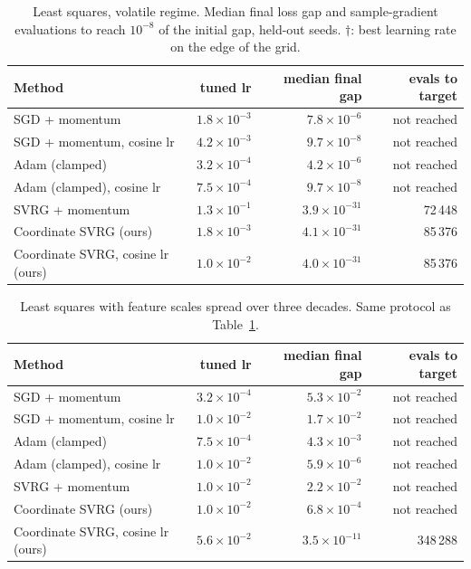 \begin{table}[h]
\centering
\small
\begin{tabular}{@{}lrrr@{}}
\toprule
Method & tuned lr & median final gap & evals to target \\
\midrule
SGD + momentum & $1.8\times 10^{-3}$ & $7.8\times 10^{-6}$ & not reached \\
SGD + momentum, cosine lr & $4.2\times 10^{-3}$ & $9.7\times 10^{-8}$ & not reached \\
Adam (clamped) & $3.2\times 10^{-4}$ & $4.2\times 10^{-6}$ & not reached \\
Adam (clamped), cosine lr & $7.5\times 10^{-4}$ & $9.7\times 10^{-8}$ & not reached \\
SVRG + momentum & $1.3\times 10^{-1}$ & $3.9\times 10^{-31}$ & 72\,448 \\
Coordinate SVRG (ours) & $1.8\times 10^{-3}$ & $4.1\times 10^{-31}$ & 85\,376 \\
Coordinate SVRG, cosine lr (ours) & $1.0\times 10^{-2}$ & $4.0\times 10^{-31}$ & 85\,376 \\
\bottomrule
\end{tabular}
\caption{Least squares, volatile regime. Median final loss gap and sample-gradient evaluations to reach $10^{-8}$ of the initial gap, held-out seeds. $\dagger$: best learning rate on the edge of the grid.}
\label{tab:ls}
\end{table}

\begin{table}[h]
\centering
\small
\begin{tabular}{@{}lrrr@{}}
\toprule
Method & tuned lr & median final gap & evals to target \\
\midrule
SGD + momentum & $3.2\times 10^{-4}$ & $5.3\times 10^{-2}$ & not reached \\
SGD + momentum, cosine lr & $1.0\times 10^{-2}$ & $1.7\times 10^{-2}$ & not reached \\
Adam (clamped) & $7.5\times 10^{-4}$ & $4.3\times 10^{-3}$ & not reached \\
Adam (clamped), cosine lr & $1.0\times 10^{-2}$ & $5.9\times 10^{-6}$ & not reached \\
SVRG + momentum & $1.0\times 10^{-2}$ & $2.2\times 10^{-2}$ & not reached \\
Coordinate SVRG (ours) & $1.0\times 10^{-2}$ & $6.8\times 10^{-4}$ & not reached \\
Coordinate SVRG, cosine lr (ours) & $5.6\times 10^{-2}$ & $3.5\times 10^{-11}$ & 348\,288 \\
\bottomrule
\end{tabular}
\caption{Least squares with feature scales spread over three decades. Same protocol as Table~\ref{tab:ls}.}
\label{tab:hetero}
\end{table}


